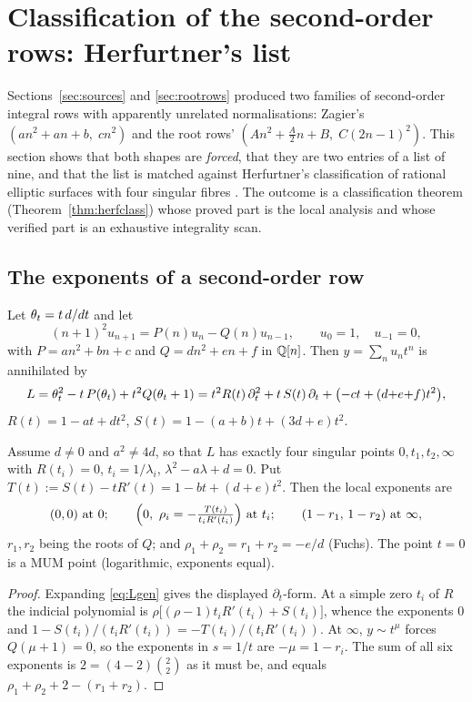 \section{Classification of the second-order rows: Herfurtner's list}\label{sec:herf}

Sections~\ref{sec:sources} and \ref{sec:rootrows} produced two families of
second-order integral rows with apparently unrelated normalisations: Zagier's
$(an^2+an+b,\;cn^2)$ and the root rows'
$(An^2+\tfrac A2n+B,\;C(2n-1)^2)$. This section shows that both shapes are
\emph{forced}, that they are two entries of a list of nine, and that the list is
matched against Herfurtner's classification of rational elliptic surfaces with
four singular fibres \cite{Herfurtner1991}. The outcome is a classification
theorem (Theorem~\ref{thm:herfclass}) whose proved part is the local analysis
and whose verified part is an exhaustive integrality scan.

\subsection{The exponents of a second-order row}

Let $\theta_t=t\,d/dt$ and let
\begin{equation}\label{eq:R2gen}
(n+1)^2u_{n+1}=P(n)u_n-Q(n)u_{n-1},\qquad u_0=1,\quad u_{-1}=0,
\end{equation}
with $P=an^2+bn+c$ and $Q=dn^2+en+f$ in $\mathbb{Q}[n]$. Then $y=\sum_nu_nt^n$ is
annihilated by
\begin{equation}\label{eq:Lgen}
L=\theta_t^2-t\,P(\theta_t)+t^2Q(\theta_t+1)
 =t^2R(t)\,\partial_t^2+t\,S(t)\,\partial_t+\bigl(-ct+(d{+}e{+}f)t^2\bigr),
\end{equation}
$R(t)=1-at+dt^2$, $S(t)=1-(a+b)t+(3d+e)t^2$.

\begin{lemma}\label{lem:exps}
\Proved{} Assume $d\neq0$ and $a^2\neq4d$, so that $L$ has exactly four singular
points $0,t_1,t_2,\infty$ with $R(t_i)=0$, $t_i=1/\lambda_i$, $\lambda^2-a\lambda+d=0$.
Put $T(t):=S(t)-tR'(t)=1-bt+(d+e)t^2$. Then the local exponents are
\[
(0,0)\ \text{at }0;\qquad
\Bigl(0,\ \rho_i=-\tfrac{T(t_i)}{t_iR'(t_i)}\Bigr)\ \text{at }t_i;\qquad
(1-r_1,\,1-r_2)\ \text{at }\infty,
\]
$r_1,r_2$ being the roots of $Q$; and $\rho_1+\rho_2=r_1+r_2=-e/d$ \textup{(}Fuchs\textup{)}.
The point $t=0$ is a MUM point \textup{(}logarithmic, exponents equal\textup{)}.
\end{lemma}

\begin{proof}
Expanding \eqref{eq:Lgen} gives the displayed $\partial_t$-form. At a simple zero
$t_i$ of $R$ the indicial polynomial is $\rho\bigl[(\rho-1)t_iR'(t_i)+S(t_i)\bigr]$,
whence the exponents $0$ and $1-S(t_i)/(t_iR'(t_i))=-T(t_i)/(t_iR'(t_i))$. At
$\infty$, $y\sim t^{\mu}$ forces $Q(\mu+1)=0$, so the exponents in $s=1/t$ are
$-\mu=1-r_i$. The sum of all six exponents is $2=(4-2)\binom22$ as it must be, and
equals $\rho_1+\rho_2+2-(r_1+r_2)$.
\end{proof}

